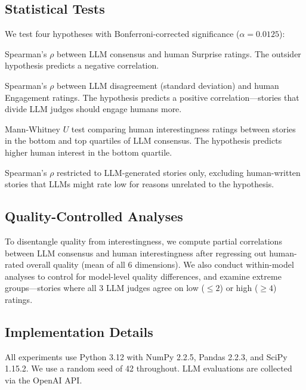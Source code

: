 \subsection{Statistical Tests}
\label{sec:tests}

We test four hypotheses with Bonferroni-corrected significance ($\alpha = 0.0125$):

Spearman's $\rho$ between LLM consensus and human Surprise ratings.
The outsider hypothesis predicts a negative correlation.

Spearman's $\rho$ between LLM disagreement (standard deviation) and human Engagement ratings.
The hypothesis predicts a positive correlation---stories that divide LLM judges should engage humans more.

Mann-Whitney $U$ test comparing human interestingness ratings between stories in the bottom and top quartiles of LLM consensus.
The hypothesis predicts higher human interest in the bottom quartile.

Spearman's $\rho$ restricted to LLM-generated stories only, excluding human-written stories that LLMs might rate low for reasons unrelated to the hypothesis.

\subsection{Quality-Controlled Analyses}
\label{sec:quality_control}

To disentangle quality from interestingness, we compute partial correlations between LLM consensus and human interestingness after regressing out human-rated overall quality (mean of all 6 dimensions).
We also conduct within-model analyses to control for model-level quality differences, and examine extreme groups---stories where all 3 LLM judges agree on low ($\leq 2$) or high ($\geq 4$) ratings.

\subsection{Implementation Details}
\label{sec:implementation}

All experiments use Python 3.12 with NumPy 2.2.5, Pandas 2.2.3, and SciPy 1.15.2.
We use a random seed of 42 throughout.
LLM evaluations are collected via the OpenAI API.
